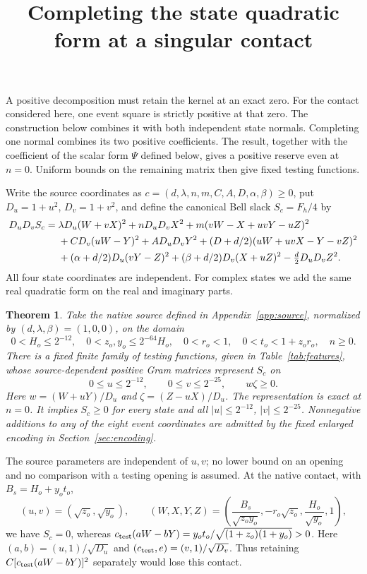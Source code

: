 \documentclass[10pt]{article}
\title{Completing the state quadratic form at a singular contact}
\author{}\date{}
\newtheorem{theorem}{Theorem}
\begin{document}
\maketitle
\vspace{-2em}

A positive decomposition must retain the kernel at an exact zero. For the
contact considered here, one event square is strictly positive at that zero.
The construction below combines it with both independent state normals.
Completing one normal combines its two positive coefficients. The result,
together with the coefficient of the scalar form $\Psi$ defined below, gives
a positive reserve even at $n=0$. Uniform bounds on the remaining matrix
then give fixed testing functions.

Write the source coordinates as
$c=(d,\lambda,n,m,C,A,D,\alpha,\beta)\geq0$, put
$D_u=1+u^2$, $D_v=1+v^2$, and define the canonical Bell slack
$S_c=F_h/4$ by
\begin{align}
 D_uD_vS_c={}&\lambda D_u(W+vX)^2+nD_uD_vX^2
 +m(vW-X+uvY-uZ)^2 \notag\\
 &+CD_v(uW-Y)^2+AD_uD_vY^2
 +(D+d/2)(uW+uvX-Y-vZ)^2 \notag\\
 &+(\alpha+d/2)D_u(vY-Z)^2
 +(\beta+d/2)D_v(X+uZ)^2-\tfrac d2D_uD_vZ^2 .
 \label{eq:slack}
\end{align}
All four state coordinates are independent. For complex states we add the
same real quadratic form on the real and imaginary parts.

\begin{theorem}\label{thm:weak}
Take the native source defined in Appendix~\ref{app:source}, normalized by
$(d,\lambda,\beta)=(1,0,0)$, on the domain
\begin{equation}
 0<H_o\leq2^{-12},\quad 0<z_o,y_o\leq2^{-64}H_o,\quad
 0<r_o<1,\quad 0<t_o<1+z_or_o,\quad n\geq0.
 \label{eq:native-domain}
\end{equation}
There is a fixed finite family of testing functions, given in
Table~\ref{tab:features}, whose source-dependent positive Gram matrices
represent $S_c$ on
\[
 0\leq u\leq2^{-12},\qquad 0\leq v\leq2^{-25},\qquad w\zeta\geq0.
\]
Here $w=(W+uY)/D_u$ and $\zeta=(Z-uX)/D_u$.
The representation is exact at $n=0$. It implies $S_c\geq0$ for every state
and all $|u|\leq2^{-12}$, $|v|\leq2^{-25}$.
Nonnegative additions to any of the eight event coordinates are admitted
by the fixed enlarged encoding in Section~\ref{sec:encoding}.
\end{theorem}

The source parameters are independent of $u,v$; no lower bound on an opening
and no comparison with a testing opening is assumed. At the native contact,
with $B_s=H_o+y_ot_o$,
\begin{equation}
 (u,v)=(\sqrt{z_o},\sqrt{y_o}),\qquad
 (W,X,Y,Z)=\left(\frac{B_s}{\sqrt{z_oy_o}},-r_o\sqrt{z_o},
                    \frac{H_o}{\sqrt{y_o}},1\right),
 \label{eq:contact}
\end{equation}
we have $S_c=0$, whereas
$c_{\rm test}(aW-bY)=y_ot_o/\sqrt{(1+z_o)(1+y_o)}>0$.
Here $(a,b)=(u,1)/\sqrt{D_u}$ and
$(c_{\rm test},e)=(v,1)/\sqrt{D_v}$. Thus retaining
$C[c_{\rm test}(aW-bY)]^2$ separately would lose this contact.
\end{document}
